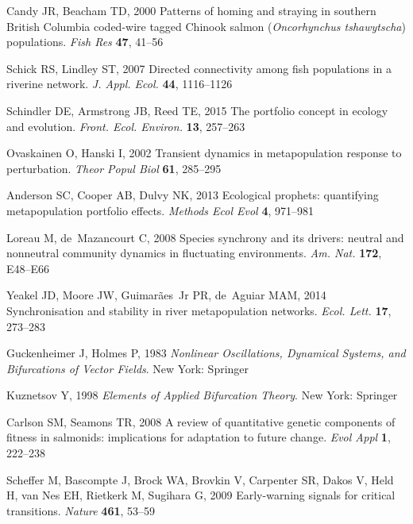 \documentclass{revtex4}
\begin{document}
\begin{thebibliography}{10}
Candy JR, Beacham TD, 2000 {Patterns of homing and straying in southern British
  Columbia coded-wire tagged Chinook salmon (\emph{Oncorhynchus tshawytscha})
  populations}.
\newblock \emph{Fish Res} \textbf{47}, 41--56

Schick RS, Lindley ST, 2007 {Directed connectivity among fish populations in a
  riverine network}.
\newblock \emph{J. Appl. Ecol.} \textbf{44}, 1116--1126

Schindler DE, Armstrong JB, Reed TE, 2015 {The portfolio concept in ecology and
  evolution}.
\newblock \emph{Front. Ecol. Environ.} \textbf{13}, 257--263

Ovaskainen O, Hanski I, 2002 {Transient dynamics in metapopulation response to
  perturbation}.
\newblock \emph{Theor Popul Biol} \textbf{61}, 285--295

Anderson SC, Cooper AB, Dulvy NK, 2013 {Ecological prophets: quantifying
  metapopulation portfolio effects}.
\newblock \emph{Methods Ecol Evol} \textbf{4}, 971--981

Loreau M, de~Mazancourt C, 2008 {Species synchrony and its drivers: neutral and
  nonneutral community dynamics in fluctuating environments}.
\newblock \emph{Am. Nat.} \textbf{172}, E48--E66

Yeakel JD, Moore JW, Guimar{\~a}es~Jr PR, de~Aguiar MAM, 2014 {Synchronisation
  and stability in river metapopulation networks}.
\newblock \emph{Ecol. Lett.} \textbf{17}, 273--283

Guckenheimer J, Holmes P, 1983 \emph{{Nonlinear Oscillations, Dynamical
  Systems, and Bifurcations of Vector Fields}}.
\newblock New York: Springer

Kuznetsov Y, 1998 \emph{{Elements of Applied Bifurcation Theory}}.
\newblock New York: Springer

Carlson SM, Seamons TR, 2008 {A review of quantitative genetic components of
  fitness in salmonids: implications for adaptation to future change}.
\newblock \emph{Evol Appl} \textbf{1}, 222--238

Scheffer M, Bascompte J, Brock WA, Brovkin V, Carpenter SR, Dakos V, Held H,
  van Nes EH, Rietkerk M, Sugihara G, 2009 {Early-warning signals for critical
  transitions}.
\newblock \emph{Nature} \textbf{461}, 53--59


\end{thebibliography}
\end{document}
